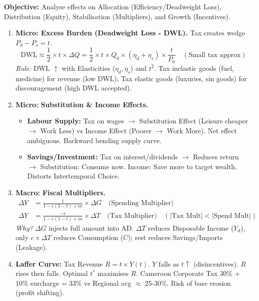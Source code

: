 \documentclass[11pt]{article}
\begin{document}
\begin{methode}
\textbf{Objective:} Analyse effects on Allocation (Efficiency/Deadweight Loss), Distribution (Equity), Stabilisation (Multipliers), and Growth (Incentives).
\begin{enumerate}
    \item \textbf{Micro: Excess Burden (Deadweight Loss - DWL).} Tax creates wedge $P_d - P_s = t$. 
    \[
    \text{DWL} \approx \frac{1}{2} \times t \times \Delta Q = \frac{1}{2} \times t \times Q_0 \times (\eta_d + \eta_s) \times \frac{t}{P_0} \quad (\text{Small tax approx})
    \]
    \textit{Rule:} DWL $\uparrow$ with Elasticities ($\eta_d, \eta_s$) and $t^2$. Tax inelastic goods (fuel, medicine) for revenue (low DWL); Tax elastic goods (luxuries, sin goods) for discouragement (high DWL accepted).
    \item \textbf{Micro: Substitution \& Income Effects.}
    \begin{itemize}
        \item \textbf{Labour Supply:} Tax on wages $\rightarrow$ Substitution Effect (Leisure cheaper $\rightarrow$ Work Less) vs Income Effect (Poorer $\rightarrow$ Work More). Net effect ambiguous. Backward bending supply curve.
        \item \textbf{Savings/Investment:} Tax on interest/dividends $\rightarrow$ Reduces return $\rightarrow$ Substitution: Consume now. Income: Save more to target wealth. Distorts Intertemporal Choice.
    \end{itemize}
    \item \textbf{Macro: Fiscal Multipliers.}
    \begin{align*}
    \Delta Y &= \frac{1}{1 - c(1-t) + m} \times \Delta G \quad \text{(Spending Multiplier)} \\
    \Delta Y &= \frac{-c}{1 - c(1-t) + m} \times \Delta T \quad \text{(Tax Multiplier)} \quad (|\text{Tax Mult}| < |\text{Spend Mult}|)
    \end{align*}
    \textit{Why?} $\Delta G$ injects full amount into AD. $\Delta T$ reduces Disposable Income ($Y_d$), only $c \times \Delta T$ reduces Consumption ($C$); rest reduces Savings/Imports (Leakage).
    \item \textbf{Laffer Curve:} Tax Revenue $R = t \times Y(t)$. $Y$ falls as $t \uparrow$ (disincentives). $R$ rises then falls. Optimal $t^*$ maximises $R$. Cameroon Corporate Tax 30\% + 10\% surcharge = 33\% vs Regional avg $\approx$ 25-30\%. Risk of base erosion (profit shifting).
\end{enumerate}
\end{methode}
\end{document}
